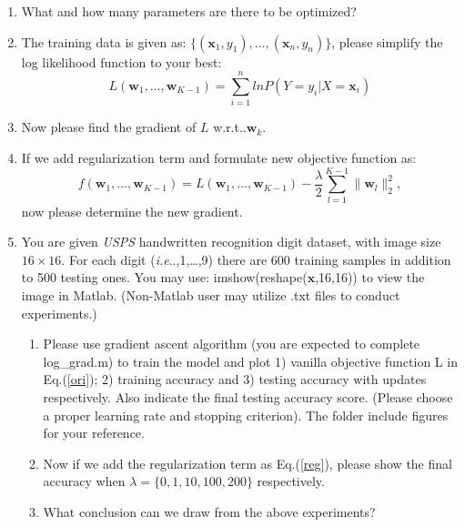 \documentclass[11pt]{article}
\makeatletter
\newcommand{\vct}[1]{\mathbf{#1}}
\def \vw {\vct{w}}
\def \vx {\vct{x}}
\DeclareRobustCommand\onedot{\futurelet\@let@token\@onedot}
\def\@onedot{\ifx\@let@token.\else.\null\fi\xspace}
\def\ie{\emph{i.e}\onedot} \def\Ie{\emph{I.e}\onedot}
\def\wrt{w.r.t\onedot} \def\dof{d.o.f\onedot}
\makeatother
\begin{document}
\begin{enumerate}
	\item What and how many parameters are there to be optimized? 

	\item The training data is given as: $\{(\vx_1,y_1),\dots,(\vx_n,y_n)\}$, please simplify the log likelihood function to your best:
	\begin{equation}\label{ori}
		L(\vw_1,\dots,\vw_{K-1})=\sum\limits_{i=1}^n ln P(Y=y_i|X=\vx_i)
	\end{equation}
	\item Now please find the gradient of $L$ \wrt $\vw_k$.
	\item If we add regularization term and formulate new objective function as:
	\begin{equation}\label{reg}
		f(\vw_1,\dots,\vw_{K-1})=L(\vw_1,\dots,\vw_{K-1})-\frac{\lambda}{2}\sum\limits_{l=1}^{K-1}\|\vw_l\|^2_2,
	\end{equation}
	now please determine the new gradient.
	\item You are given \textit{USPS} handwritten recognition digit dataset, with image size $16 \times 16$. For each digit (\ie 0,1,\dots,9) there are 600 training samples in addition to 500 testing ones. You may use: imshow(reshape($\vx$,16,16)) to view the image in Matlab. (Non-Matlab user may utilize .txt files to conduct experiments.)
	\begin{enumerate}
		\item Please use gradient ascent algorithm (you are expected to complete log\_grad.m) to train the model and plot 1) vanilla objective function L in Eq.(\ref{ori}); 2) training accuracy and 3) testing accuracy with updates respectively. Also indicate the final testing accuracy score. (Please choose a proper learning rate and stopping criterion). The folder include figures for your reference. 
		\item Now if we add the regularization term as Eq.(\ref{reg}), please show the final accuracy when $\lambda=\{0,1,10,100,200\}$ respectively.
		\item What conclusion can we draw from the above experiments?
	\end{enumerate}
\end{enumerate}
\end{document}
